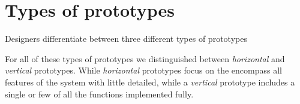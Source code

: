 \section{Types of prototypes} \label{sec:types_of_prototypes}
Designers differentiate between three different types of prototypes





For all of these types of prototypes we distinguished between \emph{horizontal} and \emph{vertical} prototypes. While \emph{horizontal} prototypes focus on the encompass all features of the system with little detailed, while a \emph{vertical} prototype includes a single or few of all the functions implemented fully. \cite[p. 179]{benyon14}
 

